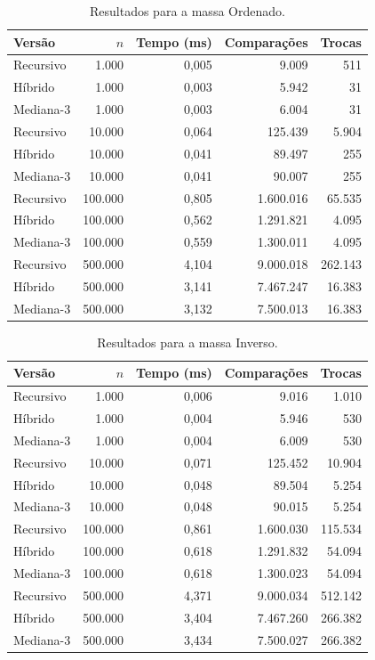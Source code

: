 \begin{table}[H]
\centering
\caption{Resultados para a massa Ordenado.}
\label{tab:ordenado}
\begin{tabular}{lrrrr}
\hline
\textbf{Versão} & \textbf{$n$} & \textbf{Tempo (ms)} & \textbf{Comparações} & \textbf{Trocas} \\
\hline
Recursivo & 1.000 & 0,005 & 9.009 & 511 \\
Híbrido & 1.000 & 0,003 & 5.942 & 31 \\
Mediana-3 & 1.000 & 0,003 & 6.004 & 31 \\
\hline
Recursivo & 10.000 & 0,064 & 125.439 & 5.904 \\
Híbrido & 10.000 & 0,041 & 89.497 & 255 \\
Mediana-3 & 10.000 & 0,041 & 90.007 & 255 \\
\hline
Recursivo & 100.000 & 0,805 & 1.600.016 & 65.535 \\
Híbrido & 100.000 & 0,562 & 1.291.821 & 4.095 \\
Mediana-3 & 100.000 & 0,559 & 1.300.011 & 4.095 \\
\hline
Recursivo & 500.000 & 4,104 & 9.000.018 & 262.143 \\
Híbrido & 500.000 & 3,141 & 7.467.247 & 16.383 \\
Mediana-3 & 500.000 & 3,132 & 7.500.013 & 16.383 \\
\hline
\end{tabular}
\end{table}

\begin{table}[H]
\centering
\caption{Resultados para a massa Inverso.}
\label{tab:inverso}
\begin{tabular}{lrrrr}
\hline
\textbf{Versão} & \textbf{$n$} & \textbf{Tempo (ms)} & \textbf{Comparações} & \textbf{Trocas} \\
\hline
Recursivo & 1.000 & 0,006 & 9.016 & 1.010 \\
Híbrido & 1.000 & 0,004 & 5.946 & 530 \\
Mediana-3 & 1.000 & 0,004 & 6.009 & 530 \\
\hline
Recursivo & 10.000 & 0,071 & 125.452 & 10.904 \\
Híbrido & 10.000 & 0,048 & 89.504 & 5.254 \\
Mediana-3 & 10.000 & 0,048 & 90.015 & 5.254 \\
\hline
Recursivo & 100.000 & 0,861 & 1.600.030 & 115.534 \\
Híbrido & 100.000 & 0,618 & 1.291.832 & 54.094 \\
Mediana-3 & 100.000 & 0,618 & 1.300.023 & 54.094 \\
\hline
Recursivo & 500.000 & 4,371 & 9.000.034 & 512.142 \\
Híbrido & 500.000 & 3,404 & 7.467.260 & 266.382 \\
Mediana-3 & 500.000 & 3,434 & 7.500.027 & 266.382 \\
\hline
\end{tabular}
\end{table}

